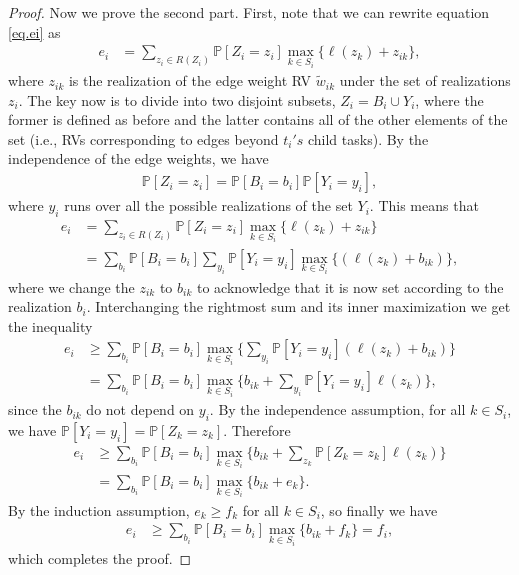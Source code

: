 \documentclass[12pt]{article}
\def\P{\mathbb{P}}
\begin{document}
\begin{proof}
	Now we prove the second part. First, note that we can rewrite equation \eqref{eq.ei} as 
	\begin{align*}
	e_i &= \sum_{z_i \in R(Z_i)} \P[Z_i = z_i] \max_{k \in S_i} \{ \ell(z_{k}) + z_{ik} \},
	\end{align*}
	where $z_{ik}$ is the realization of the edge weight RV $\tilde{w}_{ik}$ under the set of realizations $z_i$. The key now is to divide into two disjoint subsets, $Z_i = B_i \cup Y_i$, where the former is defined as before and the latter contains all of the other elements of the set (i.e., RVs corresponding to edges beyond $t_i's$ child tasks). By the independence of the edge weights, we have
	\begin{align*}
	\P[Z_i = z_i] = \P[B_i = b_i] \P[Y_i = y_i],
	\end{align*}
	where $y_i$ runs over all the possible realizations of the set $Y_i$. This means that 
	\begin{align*}
	e_i &= \sum_{z_i \in R(Z_i)} \P[Z_i = z_i] \max_{k \in S_i} \{ \ell(z_{k}) + z_{ik} \} \\
	&= \sum_{b_i} \P[B_i = b_i] \sum_{y_i} \P[Y_i = y_i]\max_{k \in S_i} \{ (\ell(z_{k}) + b_{ik}) \},
	\end{align*}
	where we change the $z_{ik}$ to $b_{ik}$ to acknowledge that it is now set according to the realization $b_i$. 
	Interchanging the rightmost sum and its inner maximization we get the inequality
	\begin{align*}
	e_i &\geq \sum_{b_i} \P[B_i = b_i] \max_{k \in S_i}  \bigg \{ \sum_{y_i} \P[Y_i = y_i] (\ell(z_{k}) + b_{ik} ) \bigg \} \\
	&= \sum_{b_i} \P[B_i = b_i] \max_{k \in S_i} \bigg \{ b_{ik} + \sum_{y_i} \P[Y_i = y_i] \ell(z_{k}) \bigg \},
	\end{align*}
	since the $b_{ik}$ do not depend on $y_i$. By the independence assumption, for all $k \in S_i$, we have $\P[Y_i = y_i] = \P[Z_k = z_k]$. Therefore 
	\begin{align*}
	e_i &\geq \sum_{b_i} \P[B_i = b_i] \max_{k \in S_i} \bigg \{ b_{ik} + \sum_{z_k} \P[Z_k = z_k] \ell(z_{k}) \bigg \} \\
	&= \sum_{b_i} \P[B_i = b_i] \max_{k \in S_i} \{ b_{ik} + e_k \}.
	\end{align*}
	By the induction assumption, $e_k \geq f_k$ for all $k \in S_i$, so finally we have
	\begin{align*}
	e_i &\geq \sum_{b_i} \P[B_i = b_i] \max_{k \in S_i} \{ b_{ik} + f_k \} = f_i,
	\end{align*}
	which completes the proof.
\end{proof}
\end{document}
